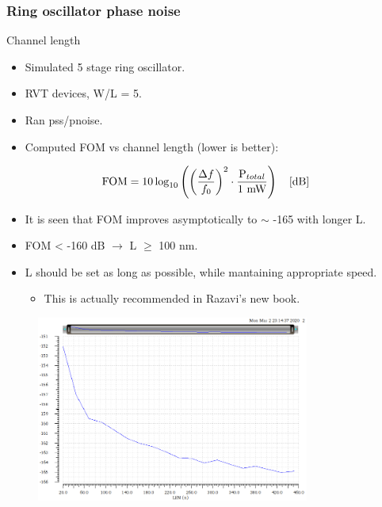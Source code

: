 \documentclass[t, screen, aspectratio=43]{beamer}
\begin{document}
\begin{frame}
	\frametitle{Ring oscillator phase noise}
	\begin{block}{Channel length}
		\begin{minipage}{4cm}
			\vspace{1em}
			\tiny

			\begin{itemize}[itemsep=4pt,label=\protect---]
				\item Simulated 5 stage ring oscillator.
				\item RVT devices, W/L = 5.
				\item Ran pss/pnoise.
				\item Computed FOM vs channel length (lower is better):
			\end{itemize}
				\begin{equation}
					\textnormal{FOM} = 10\log_{10}\left( \left( \frac{\Delta f}{f_0} \right)^2 \cdot\frac{\textnormal{P}_{total}}{\textnormal{1 mW}} \right)\hspace{1em} \textnormal{[dB]}
				\end{equation}
			\begin{itemize}[itemsep=4pt,label=\protect---]
				\item It is seen that FOM improves asymptotically to $\sim$ -165 with longer L.
				\item FOM < -160 dB $\rightarrow$ L $\geq$ 100 nm.
				\item L should be set as long as possible, while mantaining appropriate speed.
				\begin{itemize}[itemsep=4pt,label=$\bullet$]
					\item This is actually recommended in Razavi's new book.
				\end{itemize}
			\end{itemize}
		\end{minipage}%
		\begin{minipage}{8cm}
			\begin{figure}[htb!]
			        \centering
			        \includegraphics[width=0.8\textwidth, angle=0]{ro_pn_vs_length2}
			\end{figure}
		\end{minipage}%


\end{block}
\end{frame}
\end{document}
